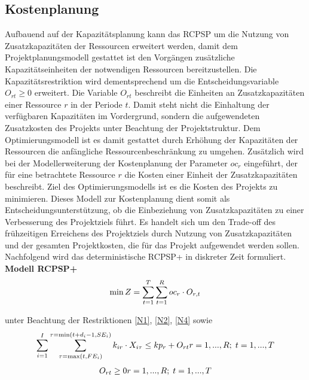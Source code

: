\documentclass[a4paper,12pt,parskip,bibtotoc,liststotoc]{article}
\begin{document}
\subsection{Kostenplanung}
Aufbauend auf der Kapazitätsplanung kann das RCPSP um die Nutzung von Zusatzkapazitäten der Ressourcen erweitert werden, damit dem Projektplanungsmodell gestattet ist den Vorgängen zusätzliche Kapazitätseinheiten der notwendigen Ressourcen bereitzustellen. Die Kapazitätsrestriktion wird dementsprechend um die Entscheidungsvariable $O_{rt} \geq 0$ erweitert. Die Variable $O_{rt}$ beschreibt die Einheiten an Zusatzkapazitäten einer Ressource $r$ in der Periode $t$. Damit steht nicht die Einhaltung der verfügbaren Kapazitäten im Vordergrund, sondern die aufgewendeten Zusatzkosten des Projekts unter Beachtung der Projektstruktur. Dem Optimierungsmodell ist es damit gestattet durch Erhöhung der Kapazitäten der Ressourcen die anfängliche Ressourcenbeschränkung zu umgehen. Zusätzlich wird bei der Modellerweiterung der Kostenplanung der Parameter $oc_r$ eingeführt, der für eine betrachtete Ressource $r$ die Kosten einer Einheit der Zusatzkapazitäten beschreibt. Ziel des Optimierungsmodells ist es die Kosten des Projekts zu minimieren. Dieses Modell zur Kostenplanung dient somit als Entscheidungsunterstützung, ob die Einbeziehung von Zusatzkapazitäten zu einer Verbesserung des Projektziels führt. Es handelt sich um den Trade-off des frühzeitigen Erreichens des Projektziels durch Nutzung von Zusatzkapazitäten und der gesamten Projektkosten, die für das Projekt aufgewendet werden sollen.\\

Nachfolgend wird das deterministische RCPSP+ in diskreter Zeit formuliert.\\

\textbf{Modell RCPSP+}
\begin{eqnarray} \label{Ziel2}
\min Z = \sum_{t=1}^{T}\sum_{t=1}^{R} oc_{r} \cdot O_{r,t}\hfill  
\end{eqnarray}

unter Beachtung der Restriktionen \eqref{N1}, \eqref{N2}, \eqref{N4} sowie
\begin{multline} \label{N5}
\sum_{i=1}^{I}\sum_{\tau=\max(t,FE_{i})}^{\tau=\min(t+d_i-1,SE_i)}k_ {ir} \cdot X_{i\tau} \leq kp_{r} + O_{rt}
\hfill   r =1,...,R;\; t=1,...,T
\end{multline}\vspace{-3.0ex}
\begin{multline} \label{N6}
O_{rt} \geq 0
\hfill   r =1,...,R;\; t=1,...,T \end{multline}\vspace{-6.0ex}\\
\end{document}
